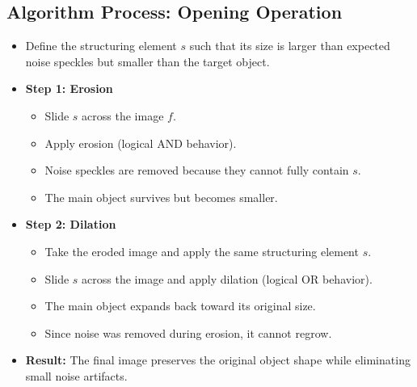 \documentclass[12pt]{article}
\begin{document}
\subsection{Algorithm Process: Opening Operation}
\begin{itemize}
    \item Define the structuring element $s$ such that its size is larger than expected noise speckles but smaller than the target object.

    \item \textbf{Step 1: Erosion}
          \begin{itemize}
              \item Slide $s$ across the image $f$.
              \item Apply erosion (logical AND behavior).
              \item Noise speckles are removed because they cannot fully contain $s$.
              \item The main object survives but becomes smaller.
          \end{itemize}

    \item \textbf{Step 2: Dilation}
          \begin{itemize}
              \item Take the eroded image and apply the same structuring element $s$.
              \item Slide $s$ across the image and apply dilation (logical OR behavior).
              \item The main object expands back toward its original size.
              \item Since noise was removed during erosion, it cannot regrow.
          \end{itemize}

    \item \textbf{Result:} The final image preserves the original object shape while eliminating small noise artifacts.
\end{itemize}
\end{document}
